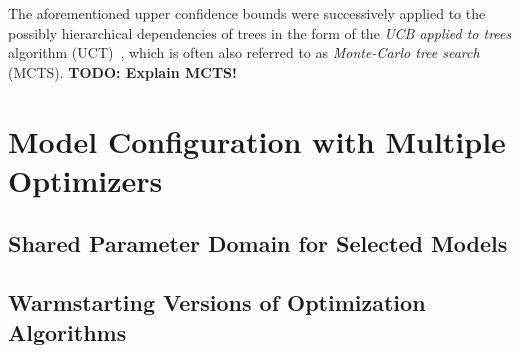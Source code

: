 The aforementioned upper confidence bounds were successively applied to the possibly hierarchical dependencies of trees in the form of the \textit{UCB applied to trees} algorithm (UCT)~\cite{Kocsis-UCT}, which is often also referred to as \textit{Monte-Carlo tree search} (MCTS).
\textbf{TODO: Explain MCTS!}

\section{Model Configuration with Multiple Optimizers}
\label{sec:approach:configuration}

\Blindtext

\subsection{Shared Parameter Domain for Selected Models}
\label{sec:appraoch:configuration:parameter}

\Blindtext

\subsection{Warmstarting Versions of Optimization Algorithms}
\label{sec:appraoch:configuration:warmstart}

\Blindtext